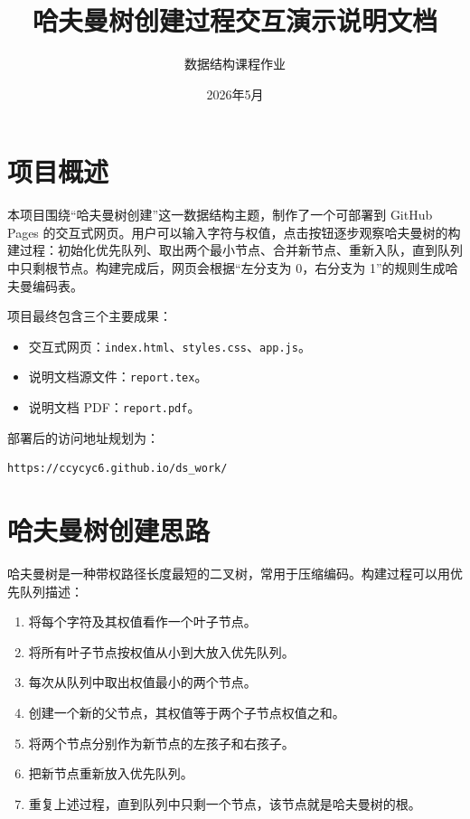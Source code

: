 \documentclass[UTF8,a4paper,12pt]{ctexart}
\title{哈夫曼树创建过程交互演示说明文档}
\author{数据结构课程作业}
\date{2026年5月}
\begin{document}
\maketitle

\section{项目概述}

本项目围绕“哈夫曼树创建”这一数据结构主题，制作了一个可部署到 GitHub Pages 的交互式网页。用户可以输入字符与权值，点击按钮逐步观察哈夫曼树的构建过程：初始化优先队列、取出两个最小节点、合并新节点、重新入队，直到队列中只剩根节点。构建完成后，网页会根据“左分支为 0，右分支为 1”的规则生成哈夫曼编码表。

项目最终包含三个主要成果：

\begin{itemize}
  \item 交互式网页：\texttt{index.html}、\texttt{styles.css}、\texttt{app.js}。
  \item 说明文档源文件：\texttt{report.tex}。
  \item 说明文档 PDF：\texttt{report.pdf}。
\end{itemize}

部署后的访问地址规划为：

\begin{lstlisting}
https://ccycyc6.github.io/ds_work/
\end{lstlisting}

\section{哈夫曼树创建思路}

哈夫曼树是一种带权路径长度最短的二叉树，常用于压缩编码。构建过程可以用优先队列描述：

\begin{enumerate}
  \item 将每个字符及其权值看作一个叶子节点。
  \item 将所有叶子节点按权值从小到大放入优先队列。
  \item 每次从队列中取出权值最小的两个节点。
  \item 创建一个新的父节点，其权值等于两个子节点权值之和。
  \item 将两个节点分别作为新节点的左孩子和右孩子。
  \item 把新节点重新放入优先队列。
  \item 重复上述过程，直到队列中只剩一个节点，该节点就是哈夫曼树的根。
\end{enumerate}
\end{document}
